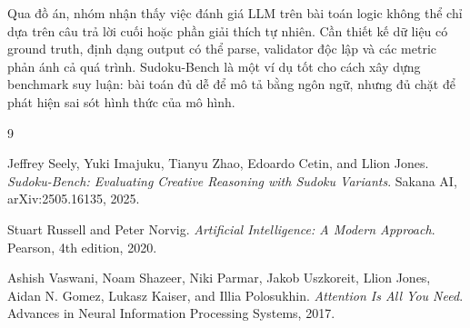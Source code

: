 \documentclass[12pt,a4paper,oneside]{report}
\newlength{\manualparindent}
\newcommand{\manualindent}{\hspace*{\manualparindent}}
\begin{document}
\manualindent%
Qua đồ án, nhóm nhận thấy việc đánh giá LLM trên bài toán logic không thể chỉ dựa trên câu trả lời cuối hoặc phần giải thích tự nhiên. Cần thiết kế dữ liệu có ground truth, định dạng output có thể parse, validator độc lập và các metric phản ánh cả quá trình. Sudoku-Bench là một ví dụ tốt cho cách xây dựng benchmark suy luận: bài toán đủ dễ để mô tả bằng ngôn ngữ, nhưng đủ chặt để phát hiện sai sót hình thức của mô hình.

\begin{thebibliography}{9}

Jeffrey Seely, Yuki Imajuku, Tianyu Zhao, Edoardo Cetin, and Llion Jones.
\textit{Sudoku-Bench: Evaluating Creative Reasoning with Sudoku Variants}.
Sakana AI, arXiv:2505.16135, 2025.

Stuart Russell and Peter Norvig.
\textit{Artificial Intelligence: A Modern Approach}.
Pearson, 4th edition, 2020.

Ashish Vaswani, Noam Shazeer, Niki Parmar, Jakob Uszkoreit, Llion Jones, Aidan N. Gomez, Lukasz Kaiser, and Illia Polosukhin.
\textit{Attention Is All You Need}.
Advances in Neural Information Processing Systems, 2017.

\end{thebibliography}
\end{document}

